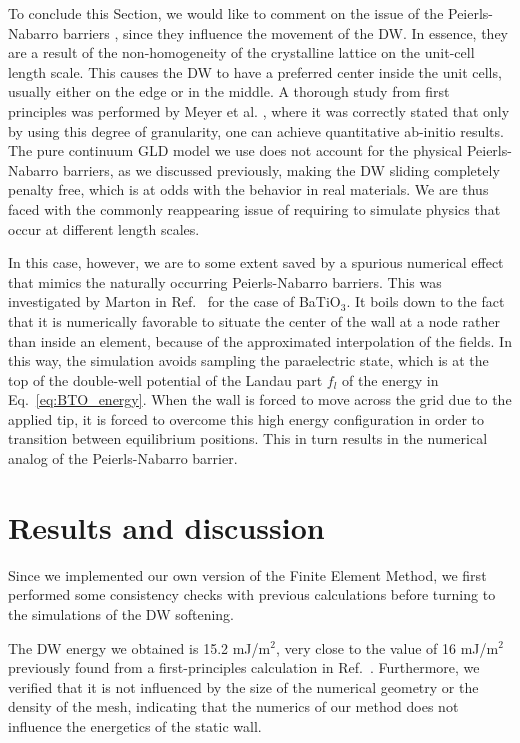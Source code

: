 To conclude this Section, we would like to comment on the issue of the Peierls-Nabarro barriers \cite{Peierls1940,Nabarro1947}, since they influence the movement of the \gls{DW}.
In essence, they are a result of the non-homogeneity of the crystalline lattice on the unit-cell length scale.
This causes the \gls{DW} to have a preferred center inside the unit cells, usually either on the edge or in the middle.
A thorough study from first principles was performed by Meyer et al. \cite{Meyer2002}, where it was correctly stated that only by using this degree of granularity, one can achieve quantitative ab-initio results.
The pure continuum \gls{GLD} model we use does not account for the physical Peierls-Nabarro barriers, as we discussed previously, making the \gls{DW} sliding completely penalty free, which is at odds with the behavior in real materials.
We are thus faced with the commonly reappearing issue of requiring to simulate physics that occur at different length scales.

In this case, however, we are to some extent saved by a spurious numerical effect that mimics the naturally occurring Peierls-Nabarro barriers.
This was investigated by Marton in Ref.~\cite{Marton2018} for the case of BaTiO$_3$.
It boils down to the fact that it is numerically favorable to situate the center of the wall at a node rather than inside an element, because of the approximated interpolation of the fields.
In this way, the simulation avoids sampling the paraelectric state, which is at the top of the double-well potential of the Landau part $f_l$ of the energy in Eq.~\eqref{eq:BTO_energy}.
When the wall is forced to move across the grid due to the applied tip, it is forced to overcome this high energy configuration in order to transition between equilibrium positions.
This in turn results in the numerical analog of the Peierls-Nabarro barrier.

\section{Results and discussion \label{sec:BTO_results}}
Since we implemented our own version of the Finite Element Method, we first performed some consistency checks with previous calculations before turning to the simulations of the \gls{DW} softening.

The \gls{DW} energy we obtained is 15.2 mJ/m$^2$, very close to the value of 16 mJ/m$^2$ previously found from a first-principles calculation in Ref.~\cite{Padilla1996}.
Furthermore, we verified that it is not influenced by the size of the numerical geometry or the density of the mesh, indicating that the numerics of our method does not influence the energetics of the static wall.

